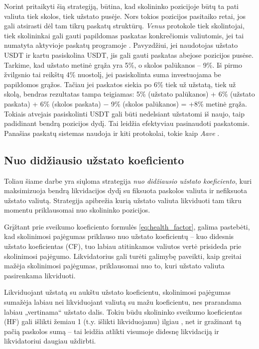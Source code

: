 \documentclass[]{VUMIFTemplateClass}
\begin{document}
Norint pritaikyti šią strategiją, būtina, kad skolininko pozicijoje būtų ta pati valiuta tiek skolos, tiek užstato pusėje. Nors tokios pozicijos pasitaiko retai, jos gali atsirasti dėl tam tikrų paskatų struktūrų. \textit{Venus} protokole tiek skolintojai, tiek skolininkai gali gauti papildomas paskatas konkrečiomis valiutomis, jei tai numatyta aktyvioje paskatų programoje \cite{venusrewards}. Pavyzdžiui, jei naudotojas užstato USDT ir kartu pasiskolina USDT, jis gali gauti paskatas abejose pozicijos pusėse. Tarkime, kad užstato metinė grąža yra 5\%, o skolos palūkanos – 9\%. Iš pirmo žvilgsnio tai reikštų 4\% nuostolį, jei pasiskolinta suma investuojama be papildomos grąžos. Tačiau jei paskatos siekia po 6\% tiek už užstatą, tiek už skolą, bendras rezultatas tampa teigiamas: 5\% (užstato palūkanos) + 6\% (užstato paskata) + 6\% (skolos paskata) − 9\% (skolos palūkanos) = +8\% metinė grąža. Tokiais atvejais pasiskolinti USDT gali būti nedelsiant užstatomi iš naujo, taip padidinant bendrą pozicijos dydį. Tai leidžia efektyviau pasinaudoti paskatomis. Panašias paskatų sistemas naudoja ir kiti protokolai, tokie kaip \textit{Aave} \cite{aaveincentives}.

\subsection{Nuo didžiausio užstato koeficiento}
\label{sec:from_largest_cf}

Toliau šiame darbe yra siųloma strategija \textit{nuo didžiausio užstato koeficiento}, kuri maksimizuoja bendrą likvidacijos dydį su fiksuota paskolos valiuta ir nefiksuota užstato valiutą. Strategija apibrežia kurią užstato valiuta likviduoti tam tikru momentu priklausomai nuo skolininko pozicijos.

Grįžtant prie sveikumo koeficiento formulės \ref{eq:health_factor}, galima pastebėti, kad skolinimosi pajėgumas priklauso nuo užstato koeficientų – kuo didesnis užstato koeficientas (CF), tuo labiau atitinkamos valiutos vertė prisideda prie skolinimosi pajėgumo. Likvidatorius gali turėti galimybę paveikti, kaip greitai mažėja skolinimosi pajėgumas, priklausomai nuo to, kuri užstato valiuta pasirenkama likviduoti. 

Likviduojant užstatą su aukštu užstato koeficientu, skolinimosi pajėgumas sumažėja labiau nei likviduojant valiutą su mažu koeficientu, nes prarandama labiau „vertinama“ užstato dalis. Tokiu būdu skolininko sveikumo koeficientas (HF) gali išlikti žemiau 1 (t.y. išlikti likviduojamu) ilgiau , net ir gražinant tą pačią paskolos sumą – tai leidžia atlikti visumoje didesnę likvidaciją ir likvidatoriui daugiau uždirbti.
\end{document}
